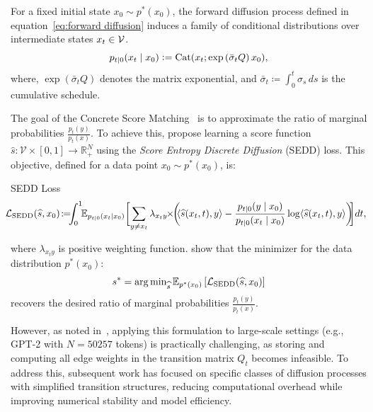   For a fixed initial state $x_0 \sim p^*(x_0)$, the forward diffusion process defined in equation~\eqref{eq:forward diffusion} induces a family of conditional distributions over intermediate states $x_t \in \mathcal{V}$.
    \begin{equation}
      p_{t \mid 0}(x_t \mid x_0) \vcentcolon= \text{Cat}(x_t; \exp\left(\bar{\sigma}_t Q\right)x_0 ), 
    \label{eq:conditional_distribution}
    \end{equation}
  where, $\exp\left(\bar{\sigma}_t Q\right)$ denotes the matrix exponential,
and $\bar{\sigma}_t \coloneqq \int_{0}^{t} \sigma_s \, ds$ is the cumulative schedule.



  The goal of the Concrete Score Matching~\citep{meng2022concrete, lou2024discrete} is to approximate the ratio of
marginal probabilities $\frac{p_t(y)}{p_t(x)}$. To achieve this, \citep{lou2024discrete} propose learning a score
function $\widehat{s} \colon \mathcal{V} \times [0, 1] \to \mathbb{R}_{+}^N$ using the
\textit{Score Entropy Discrete Diffusion} (SEDD) loss. This objective, defined for a data point $x_0 \sim p^*(x_0)$, is:
  \begin{Box1}{SEDD Loss}
    \vspace{-8pt}
    \begin{gather}
    \label{eq:sedd loss}
       \!\!\!\!\LC_{\text{SEDD}}(\widehat{s}, x_0) \colon\!\!\!\!= \!\!\!\int_0^1\!\! \EE_{p_{t|0}(x_t|x_0)} \biggl[\sum_{y \neq x_t} \lambda_{x_ty}
    \!\!\times\!\! \biggl(\!\!\langle \widehat{s}(x_t,t), y\rangle - \frac{p_{t \mid 0}(y \mid x_0)}{p_{t \mid 0}(x_t \mid x_0)} \log  \langle \widehat{s}(x_t, t), y\rangle \biggr)\!\!\biggr]dt,
    \end{gather}
  \end{Box1}
  where $\lambda_{x_ty}$ is positive weighting function.
  \citet{lou2024discrete} show that the minimizer for the data distribution $p^*(x_0)$: 
  \[
    s^*= \arg\min\nolimits_{\widehat{s}} \mathbb{E}_{p^*(x_0)}\left[\mathcal{L}_{\text{SEDD}}(\widehat{s}, x_0)\right]
  \] 
  recovers the desired ratio of marginal probabilities $\frac{p_t(y)}{p_t(x)}.$ 
  
  However, as noted in~\citep{lou2024discrete}, applying this formulation to large-scale settings (e.g., GPT-2 with $N = 50257$ tokens) is practically challenging, as storing and computing all edge weights in the transition matrix $Q_t$ becomes infeasible. To address this, subsequent work has focused on specific classes of diffusion processes with simplified transition structures, reducing computational overhead while improving numerical stability and model efficiency.

